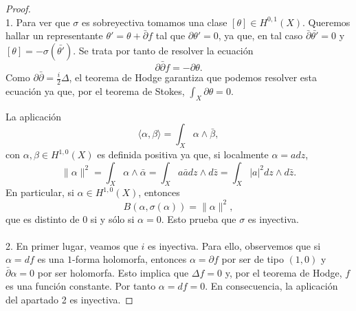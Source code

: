 \documentclass[12pt,a4paper]{article}
\theoremstyle{definition} \newtheorem{defn}[thm]{Definición}
\theoremstyle{definition} \newtheorem{ejemplo}[thm]{Ejemplo}
\theoremstyle{definition} \newtheorem{ejercicio}[thm]{Ejercicio}
\def\delbar{\bar{\partial}}
\begin{document}
      \begin{proof} \ \\
1.	Para ver que $\sigma$ es sobreyectiva tomamos una clase $[\theta] \in H^{0,1}(X)$. Queremos hallar un representante $\theta'=\theta + \delbar f$ tal que $\partial \theta'=0$, ya que, en tal caso $\delbar \bar{\theta'}=0$ y $[\theta]=-\sigma( \bar{\theta'})$. Se trata por tanto de resolver la ecuación
	\begin{equation*}
	  \partial \delbar f = -\partial \theta.
	\end{equation*}
	Como $\partial \delbar = \tfrac{i}{2} \Delta$, el teorema de Hodge garantiza que podemos resolver esta ecuación ya que, por el teorema de Stokes, $\int_X \partial \theta = 0$. 

	La aplicación
	\begin{equation*}
	 \langle \alpha,\beta \rangle=  \int_X \alpha \wedge \bar{\beta},
	\end{equation*}
	con $\alpha, \beta \in H^{1,0}(X)$ es definida positiva ya que, si localmente $\alpha=adz$,
	\begin{equation*}
	  \lVert \alpha \rVert^2 = \int_X \alpha \wedge \bar{\alpha} = \int_X a \bar{a} dz \wedge d\bar{z} = \int_X  |a|^2 dz \wedge d\bar{z}.
	\end{equation*}
	En particular, si $\alpha \in H^{1,0}(X)$, entonces
	\begin{equation*}
	  B(\alpha,\sigma(\alpha)) = \lVert \alpha \rVert ^2,
	\end{equation*}
	que es distinto de $0$ si y sólo si $\alpha=0$. Esto prueba que $\sigma$ es inyectiva. \ \\
	\ \\
	2. En primer lugar, veamos que $i$ es inyectiva. Para ello, observemos que si $\alpha=df$ es una $1$-forma holomorfa, entonces $\alpha=\partial f$ por ser de tipo $(1,0)$ y $\delbar \alpha = 0$ por ser holomorfa. Esto implica que $\Delta f =0$ y, por el teorema de Hodge, $f$ es una función constante. Por tanto $\alpha = df =0$. En consecuencia, la aplicación del apartado 2 es inyectiva.


\end{proof}
\end{document}
